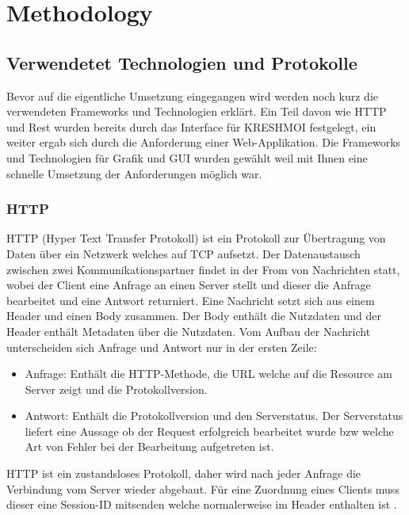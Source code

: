 \section{Methodology}
\label{sec:methodology}

\subsection{Verwendetet Technologien und Protokolle}
\label{sec:Verwendetet Technologien}
Bevor auf die eigentliche Umsetzung eingegangen wird werden noch kurz die verwendeten Frameworks und Technologien erklärt.
Ein Teil davon wie HTTP und Rest wurden bereits durch das Interface für KRESHMOI festgelegt, ein weiter ergab sich durch die Anforderung einer Web-Applikation.
Die Frameworks und Technologien für Grafik und GUI wurden gewählt weil mit Ihnen eine schnelle Umsetzung der Anforderungen möglich war.

\subsubsection{HTTP}
\label{sec:HTTP}
HTTP (Hyper Text Transfer Protokoll) ist ein Protokoll zur Übertragung von Daten über ein Netzwerk welches auf TCP aufsetzt.
Der Datenaustausch zwischen zwei Kommunikationspartner findet in der From von Nachrichten statt, 
wobei der Client eine Anfrage an einen Server stellt und dieser die Anfrage bearbeitet und eine Antwort returniert.
%
Eine Nachricht setzt sich aus einem Header und einen Body zusammen.
Der Body enthält die Nutzdaten und der Header enthält Metadaten über die Nutzdaten.
Vom Aufbau der Nachricht unterscheiden sich Anfrage und Antwort nur in der ersten Zeile:
\begin{itemize}
	\item Anfrage: Enthält die HTTP-Methode, die URL welche auf die Resource am Server zeigt und die Protokollversion.
	\item Antwort: Enthält die Protokollversion und den Serverstatus. 
		Der Serverstatus liefert eine Aussage ob der Request erfolgreich bearbeitet wurde bzw welche Art von Fehler bei der Bearbeitung aufgetreten ist.
\end{itemize}
HTTP ist ein zustandsloses Protokoll, daher wird nach jeder Anfrage die Verbindung vom Server wieder abgebaut.
Für eine Zuordnung eines Clients muss dieser eine Session-ID mitsenden welche normalerweise im Header enthalten ist \cite{http}.

